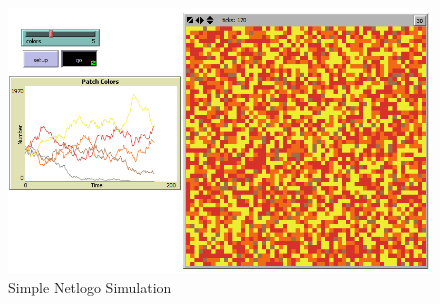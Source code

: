 \begin{figure}[H]
\begin{center}
\includegraphics[width=\textwidth*0.9]{Images/NetLogo.png}%
\end{center}
\caption{Simple Netlogo Simulation}%
\label{fig:NetLogoscreen}%
\end{figure}

